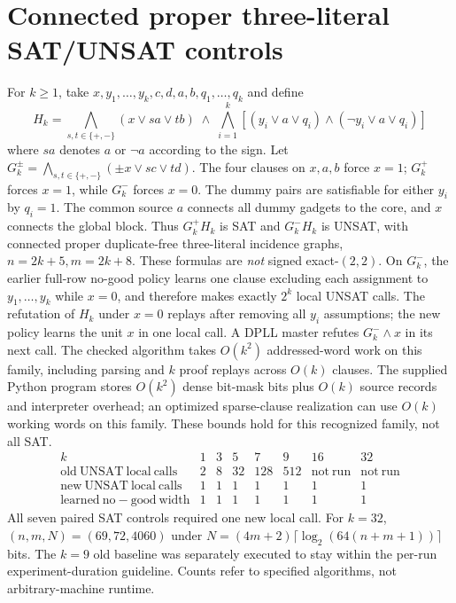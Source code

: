 \documentclass[11pt]{article}
\begin{document}
\section{Connected proper three-literal SAT/UNSAT controls}
For $k\ge1$, take $x,y_1,\dots,y_k,c,d,a,b,q_1,\dots,q_k$ and define
\[
H_k=\bigwedge_{s,t\in\{+,-\}}(x\vee s a\vee t b)
\;\wedge\;\bigwedge_{i=1}^k[(y_i\vee a\vee q_i)\wedge(\neg y_i\vee a\vee q_i)]
\]
where $s a$ denotes $a$ or $\neg a$ according to the sign. Let $G_k^\pm=\bigwedge_{s,t\in\{+,-\}}(\pm x\vee s c\vee t d)$. The four clauses on $x,a,b$ force $x=1$; $G_k^+$ forces $x=1$, while $G_k^-$ forces $x=0$. The dummy pairs are satisfiable for either $y_i$ by $q_i=1$. The common source $a$ connects all dummy gadgets to the core, and $x$ connects the global block. Thus $G_k^+H_k$ is SAT and $G_k^-H_k$ is UNSAT, with connected proper duplicate-free three-literal incidence graphs, $n=2k+5,m=2k+8$. These formulas are \emph{not} signed exact-$(2,2)$.
On $G_k^-$, the earlier full-row no-good policy learns one clause excluding each assignment to $y_1,\ldots,y_k$ while $x=0$, and therefore makes exactly $2^k$ local UNSAT calls. The refutation of $H_k$ under $x=0$ replays after removing all $y_i$ assumptions; the new policy learns the unit $x$ in one local call. A DPLL master refutes $G_k^-\wedge x$ in its next call. The checked algorithm takes $O(k^2)$ addressed-word work on this family, including parsing and $k$ proof replays across $O(k)$ clauses. The supplied Python program stores $O(k^2)$ dense bit-mask bits plus $O(k)$ source records and interpreter overhead; an optimized sparse-clause realization can use $O(k)$ working words on this family. These bounds hold for this recognized family, not all SAT.
\[
\begin{array}{c|rrrrrrr}
k&1&3&5&7&9&16&32\\\hline
\mathrm{old\ UNSAT\ local\ calls}&2&8&32&128&512&\mathrm{not\ run}&\mathrm{not\ run}\\
\mathrm{new\ UNSAT\ local\ calls}&1&1&1&1&1&1&1\\
\mathrm{learned\ no\!-\!good\ width}&1&1&1&1&1&1&1
\end{array}
\]
All seven paired SAT controls required one new local call. For $k=32$, $(n,m,N)=(69,72,4060)$ under $N=(4m+2)\lceil\log_2(64(n+m+1))\rceil$ bits. The $k=9$ old baseline was separately executed to stay within the per-run experiment-duration guideline. Counts refer to specified algorithms, not arbitrary-machine runtime.
\end{document}
